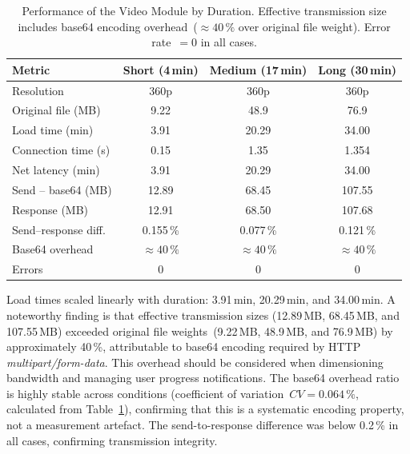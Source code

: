 \documentclass[journal]{IEEEtran}
\begin{document}
	\begin{table}[!t]
		\caption{Performance of the Video Module by Duration. Effective
			transmission size includes base64 encoding overhead~(${\approx}40\,\%$
			over original file weight). Error rate~$=0$ in all cases.}
		\label{tab:video}
		\centering
		\scriptsize
		\renewcommand{\arraystretch}{1.25}
		\begin{tabular}{lccc}
			\toprule
			\textbf{Metric} & \textbf{Short (4\,min)} & \textbf{Medium (17\,min)} & \textbf{Long (30\,min)} \\
			\midrule
			Resolution              & 360p    & 360p     & 360p     \\
			Original file (MB)      & 9.22    & 48.9     & 76.9     \\
			Load time (min)         & 3.91    & 20.29    & 34.00    \\
			Connection time (s)     & 0.15    & 1.35     & 1.354    \\
			Net latency (min)       & 3.91    & 20.29    & 34.00    \\
			Send -- base64 (MB)     & 12.89   & 68.45    & 107.55   \\
			Response (MB)           & 12.91   & 68.50    & 107.68   \\
			Send--response diff.    & 0.155\,\% & 0.077\,\% & 0.121\,\% \\
			Base64 overhead         & ${\approx}40\,\%$ & ${\approx}40\,\%$ & ${\approx}40\,\%$ \\
			Errors                  & 0       & 0        & 0        \\
			\bottomrule
		\end{tabular}
	\end{table}
	
	Load times scaled linearly with duration: 3.91\,min, 20.29\,min,
	and 34.00\,min.
	A noteworthy finding is that effective transmission sizes
	(12.89\,MB, 68.45\,MB, and 107.55\,MB) exceeded original file
	weights~(9.22\,MB, 48.9\,MB, and 76.9\,MB) by approximately
	40\,\%, attributable to base64 encoding required by HTTP
	\textit{multipart/form-data}.
	This overhead should be considered when dimensioning bandwidth
	and managing user progress notifications.
	The base64 overhead ratio is highly stable across conditions
	(coefficient of variation~$CV{=}0.064\,\%$, calculated from
	Table~\ref{tab:video}), confirming that this is a systematic
	encoding property, not a measurement artefact.
	The send-to-response difference was below 0.2\,\% in all cases,
	confirming transmission integrity.
	
\end{document}
